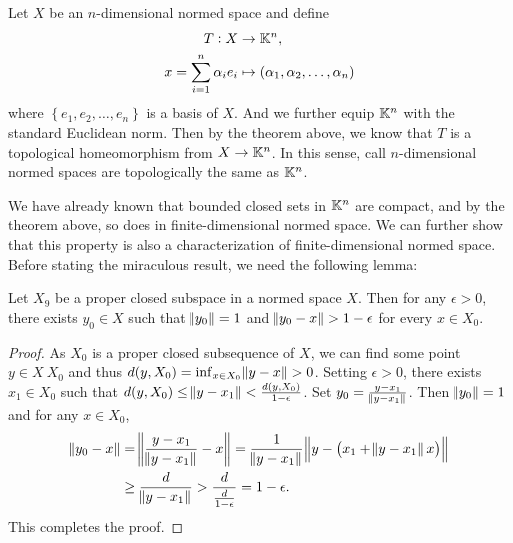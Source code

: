 Let $X$ be an $n$-dimensional normed space and define 
\begin{equation*}
    \begin{aligned}
        T: X &\to \mathbb{K}^n,  \\ 
        x = \sum_{i=1}^{n} \alpha_i e_i &\mapsto 
            (\alpha_1, \alpha_2, \ldots, \alpha_n) 
    \end{aligned}
\end{equation*}
where $\left\{ e_1, e_2, \ldots, e_n \right\}$ is a basis of $X$. 
And we further equip $\mathbb{K}^n$ with the standard Euclidean norm. 
Then by the theorem above, we know that $T$ is a topological homeomorphism 
from $X \to \mathbb{K}^n$. 
In this sense, call $n$-dimensional normed spaces are topologically the same 
as $\mathbb{K}^n$. 

We have already known that bounded closed sets in $\mathbb{K}^n$ are compact, 
and by the theorem above, so does in finite-dimensional normed space. 
We can further show that this property is also a characterization of 
finite-dimensional normed space. 
Before stating the miraculous result, we need the following lemma: 
\begin{lemma}
\label{lemma:banach_spaces:finite_dimensional:f_riesz_lemma}
Let $X_9$ be a proper closed subspace in a normed space $X$. 
Then for any $\epsilon > 0$, there exists $y_0 \in X$ such that 
$\norm{y_0} = 1$ and $\norm{y_0 - x} > 1 - \epsilon$ for every $x \in X_0$. 
\end{lemma}
\begin{proof}
As $X_0$ is a proper closed subsequence of $X$, we can find some point $y 
\in X \ X_0$ and thus $d(y, X_0) = \inf_{x \in X_0} \norm{y - x} > 0$. 
Setting $\epsilon > 0$, there exists $x_1 \in X_0$ such that $d(y, X_0) \le 
\norm{y - x_1} < \frac{d(y, X_0)}{1 - \epsilon}$. 
Set $y_0 = \frac{y - x_1}{\norm{y - x_1}}$. 
Then $\norm{y_0} = 1$ and for any $x \in X_0$, 
\begin{equation*}
    \begin{aligned}
        \norm{y_0 - x} 
        &= \norm{\frac{y-x_1}{\norm{y - x_1}} - x} 
        = \frac{1}{\norm{y - x_1}} \norm{y - \left( x_1 + \norm{y - x_1}x \right)} \\
        &\ge \frac{d}{\norm{y - x_1}} > \frac{d}{\frac{d}{1-\epsilon}} = 1 - \epsilon. 
    \end{aligned}
\end{equation*}
This completes the proof. 
\end{proof}

